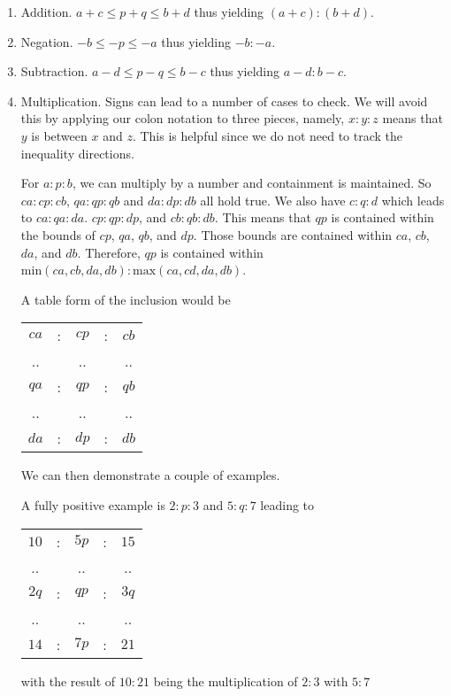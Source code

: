 \documentclass[12pt]{article}
\theoremstyle{remark}
\begin{document}
\begin{enumerate}
    \item Addition.   $a +c \leq  p + q \leq  b +d$ thus yielding $(a+c):(b+d)$.
    \item Negation.  $-b \leq -p \leq -a$ thus yielding $-b:-a$.
    \item Subtraction.  $a - d \leq p-q \leq b -c$  thus yielding $a-d:b-c$.
    \item Multiplication. Signs can lead to a number of cases to check. We will avoid this by  applying our colon notation to three pieces, namely,  $x:y:z$ means that $y$ is between $x$ and $z$. This is helpful since we do not need to track the inequality directions. 
    
    For $a:p:b$, we can multiply by a number and containment is maintained. So $ca:cp:cb$, $qa: qp: qb$ and $da:dp:db$ all hold true. We also have $c:q:d$ which leads to $ca:qa:da$. $cp:qp:dp$, and $cb:qb:db$. This means that $qp$ is contained within the bounds of $cp$, $qa$, $qb$, and $dp$. Those bounds are contained within $ca$, $cb$, $da$, and $db$. Therefore, $qp$ is contained within $\mathrm{min}(ca, cb, da, db):\mathrm{max}(ca, cd, da, db)$. 
    
    A table form of the inclusion would be 
    
    \begin{tabular}{ccccc}
        $ca$ &:& $cp$ &:& $cb$ \\
        .. & & .. & & .. \\
        $qa$ &:& $qp$ &:& $qb$\\
        .. & & .. & & .. \\
         $da$ &:& $dp$&:& $db$
    \end{tabular}
    
    
    
    We can then demonstrate a couple of examples. 
    
    A fully positive example is $2:p:3$ and $5:q:7$ leading to 
    
     \begin{tabular}{ccccc}
        $10$ &:& $5p$ &:& $15$ \\
        .. & & .. & & .. \\
        $2q$ &:& $qp$ &:& $3q$\\
        .. & & .. & & .. \\
         $14$ &:& $7p$&:& $21$
    \end{tabular}
    
    with the result of $10:21$ being the multiplication of $2:3$ with $5:7$
    

\end{enumerate}
\end{document}
